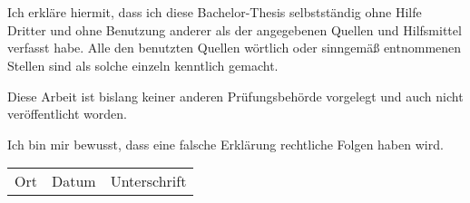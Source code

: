 \section*{\thesisAffidavitName}

Ich erkläre hiermit, dass ich diese Bachelor-Thesis selbstständig ohne Hilfe Dritter und ohne Benutzung anderer als der angegebenen Quellen und Hilfsmittel verfasst habe. Alle den benutzten Quellen wörtlich oder sinngemäß entnommenen Stellen sind als solche einzeln kenntlich gemacht.

Diese Arbeit ist bislang keiner anderen Prüfungsbehörde vorgelegt und auch nicht veröffentlicht worden.

Ich bin mir bewusst, dass eine falsche Erklärung rechtliche Folgen haben wird. 

\vspace{36pt}
\begin{tabular}[t]{m{} m{}  m{} }
& & \\
\hline
Ort & Datum & Unterschrift
\end{tabular}